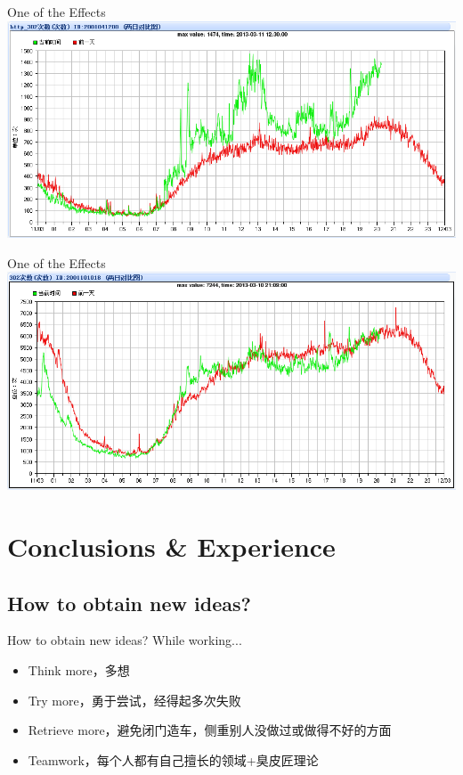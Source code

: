\documentclass{beamer}
\begin{document}
\begin{frame}{One of the Effects}
\includegraphics[scale=0.4]{fig/back_src_news.png}
\end{frame}
\begin{frame}{One of the Effects}
\includegraphics[scale=0.4]{fig/back_src_all.png}
\end{frame}

\section{Conclusions \& Experience}
\subsection{How to obtain new ideas?}
\begin{frame}{How to obtain new ideas?}
While working...
\pause
\begin{itemize}
\item Think more，多想
\item Try more，勇于尝试，经得起多次失败
\item Retrieve more，避免闭门造车，侧重别人没做过或做得不好的方面
\item Teamwork，每个人都有自己擅长的领域+臭皮匠理论
\end{itemize}

\end{frame}
\end{document}
